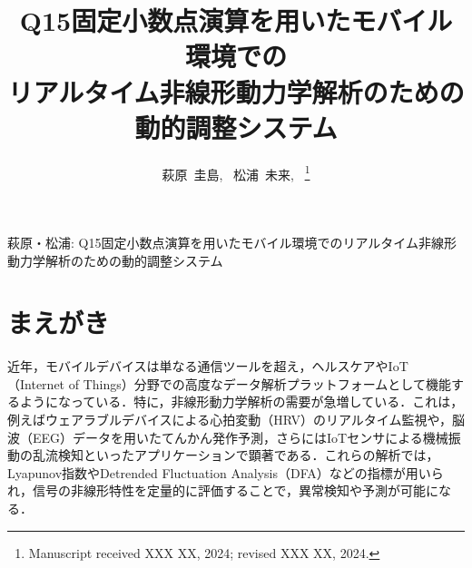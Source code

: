 \documentclass[10pt,journal,compsoc]{IEEEtran}
\begin{document}
\title{Q15固定小数点演算を用いたモバイル環境での\\リアルタイム非線形動力学解析のための動的調整システム}

\author{萩原~圭島,~
        松浦~未来,~
\thanks{Manuscript received XXX XX, 2024; revised XXX XX, 2024.}}

%
{萩原・松浦: Q15固定小数点演算を用いたモバイル環境でのリアルタイム非線形動力学解析のための動的調整システム}


\maketitle

\IEEEdisplaynontitleabstractindextext

\IEEEpeerreviewmaketitle

\section{まえがき}

近年，モバイルデバイスは単なる通信ツールを超え，ヘルスケアやIoT（Internet of Things）分野での高度なデータ解析プラットフォームとして機能するようになっている．特に，非線形動力学解析の需要が急増している．これは，例えばウェアラブルデバイスによる心拍変動（HRV）のリアルタイム監視や，脳波（EEG）データを用いたてんかん発作予測，さらにはIoTセンサによる機械振動の乱流検知といったアプリケーションで顕著である\cite{shi2016edge}．これらの解析では，Lyapunov指数やDetrended Fluctuation Analysis（DFA）などの指標が用いられ，信号の非線形特性を定量的に評価することで，異常検知や予測が可能になる．
\end{document}
